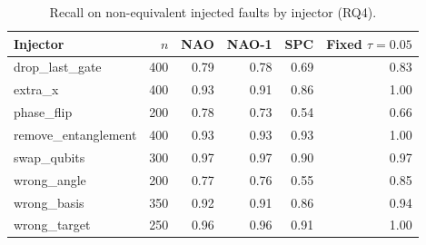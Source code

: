 \begin{table}[t]
\centering
\caption{Recall on non-equivalent injected faults by injector (RQ4).}
\label{tab:app-injector}
\small
\begin{tabular}{lrrrrr}
\toprule
Injector & $n$ & NAO & NAO-1 & SPC & Fixed $\tau=0.05$ \\
\midrule
drop\_last\_gate & 400 & 0.79 & 0.78 & 0.69 & 0.83 \\
extra\_x & 400 & 0.93 & 0.91 & 0.86 & 1.00 \\
phase\_flip & 200 & 0.78 & 0.73 & 0.54 & 0.66 \\
remove\_entanglement & 400 & 0.93 & 0.93 & 0.93 & 1.00 \\
swap\_qubits & 300 & 0.97 & 0.97 & 0.90 & 0.97 \\
wrong\_angle & 200 & 0.77 & 0.76 & 0.55 & 0.85 \\
wrong\_basis & 350 & 0.92 & 0.91 & 0.86 & 0.94 \\
wrong\_target & 250 & 0.96 & 0.96 & 0.91 & 1.00 \\
\bottomrule
\end{tabular}
\end{table}
